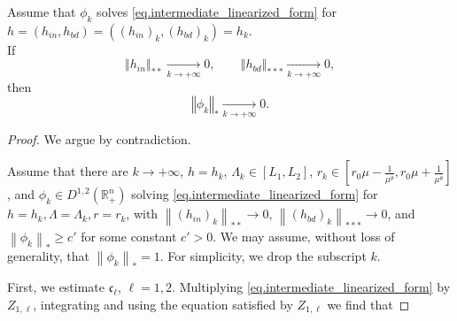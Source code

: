 \documentclass[11pt,a4paper]{amsart}
\begin{document}
\begin{lemma}\label{eq.constraint_0_norm}
  Assume that $\phi_k$ solves \eqref{eq.intermediate_linearized_form} for $h=(h_{in},h_{bd}) =\left((h_{in})_k, (h_{bd})_k\right)=h_k$.\\ If $$\left\Vert h_{in}\right\Vert_{**}\underset{k\to+\infty}\to0,\qquad\left\Vert h_{bd}\right\Vert_{***}\underset{k\to+\infty}\to0,$$
then
$$\left\Vert \phi_k\right\Vert_*\underset{k\to+\infty}\to0.$$
\end{lemma}
\begin{proof}
We argue by contradiction.

  Assume that there are $k \rightarrow+\infty$, $h=h_{k}$, $\Lambda_{k} \in\left[L_{1}, L_{2}\right]$, $r_{k} \in\left[r_{0} \mu-\frac{1}{\mu^{\bar{\theta}}}, r_{0} \mu+\frac{1}{\mu^{\bar{\theta}}}\right]$, and $\phi_{k} \in D^{1,2}\left(\mathbb{R}_{+}^{n}\right)$ solving \eqref{eq.intermediate_linearized_form} for $h=h_{k}, \Lambda=\Lambda_{k}, r=r_{k}$, with $\left\|(h_{in})_{k}\right\|_{* *} \rightarrow 0$, $\left\|(h_{bd})_{k}\right\|_{***} \rightarrow 0$, and $\left\|\phi_{k}\right\|_{*} \geq c'$ for some constant $c'>0$. We may assume, without loss of generality, that $\left\|\phi_{k}\right\|_{*}=1$. For simplicity, we drop the subscript $k$.

First, we estimate $\mathfrak c_{\ell}$, $\ell =1,2$. Multiplying \eqref{eq.intermediate_linearized_form} by $Z_{1, \ell}$, integrating and using the equation satisfied by $Z_{1,\ell}$ we find that


\end{proof}
\end{document}
